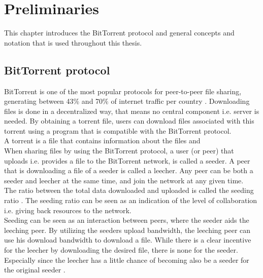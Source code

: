 \chapter{Preliminaries}

This chapter introduces the BitTorrent protocol and general concepts and notation that is used throughout this thesis.

\section{BitTorrent protocol}
BitTorrent is one of the most popular protocols for peer-to-peer file sharing, generating between 43\% and 70\% of internet traffic per country .
Downloading files is done in a decentralized way, that means no central component i.e. server is needed.
By obtaining a torrent file, users can download files associated with this torrent using a program that is compatible with the BitTorrent protocol.\\

A torrent is a file that contains information about the files and \\
 
When sharing files by using the BitTorrent protocol, a user (or peer) that uploads i.e. provides a file to the BitTorrent network, is called a seeder.
A peer that is downloading a file of a seeder is called a leecher.
Any peer can be both a seeder and leecher at the same time, and join the network at any given time.\\

The ratio between the total data downloaded and uploaded is called the seeding ratio \cite{Cohen-bittorrent}.
The seeding ratio can be seen as an indication of the level of collaboration i.e. giving back resources to the network.\\

\iffalse
Seeding can be seen as an interaction between peers, where the seeder aids the leeching peer.
By utilizing the seeders upload bandwidth, the leeching peer can use his download bandwidth to download a file.
While there is a clear incentive for the leecher by downloading the desired file, there is none for the seeder.
Especially since the leecher has a little chance of becoming also be a seeder for the original seeder \cite{Lai-Incentives}.\\

